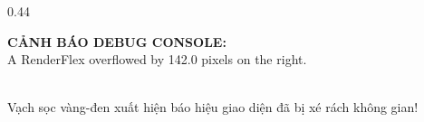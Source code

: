 \documentclass[aspectratio=169, 10pt]{beamer}
\begin{document}
\begin{frame}
\begin{columns}[T]
    \begin{column}{0.44\textwidth}
      \centering
      \begin{tcolorbox}[colback=red!5, colframe=ErrorRed, arc=6pt, boxrule=1.2pt, left=8pt, right=8pt, top=8pt, bottom=8pt]
        \centering
        \textbf{\textcolor{ErrorRed}{\small CẢNH BÁO DEBUG CONSOLE:}}\\[0.15cm]
        {\scriptsize \ttfamily A RenderFlex overflowed by 142.0 pixels on the right.}\\[0.25cm]
        \\[0.15cm]
        {\tiny Vạch sọc vàng-đen xuất hiện báo hiệu giao diện đã bị xé rách không gian!}
      \end{tcolorbox}
    \end{column}
  \end{columns}
\end{frame}
\end{document}

